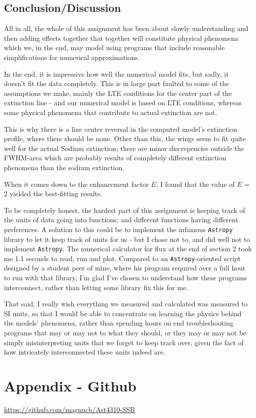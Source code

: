 \documentclass[11pt,a4paper,notitlepage]{article}
\begin{document}
\subsection{Conclusion/Discussion}
All in all, the whole of this assignment has been about slowly understanding and then adding effects together that together will constitute physical phenomena which we, in the end, may model using programs that include reasonable simplifications for numerical approximations.



In the end, it is impressive how well the numerical model fits, but sadly, it doesn't fit the data completely. This is in large part faulted to some of the assumptions we make, mainly the LTE conditions for the center part of the extinction line - and our numerical model is based on LTE conditions, whereas some physical phenomena that contribute to actual extinction are not.

This is why there is a line center reversal in the computed model's extinction profile, where there should be none. Other than this, the wings seem to fit quite well for the actual Sodium extinction; there are minor discrepencies outside the FWHM-area which are probably results of completely different extinction phenomena than the sodium extinction.

When it comes down to the enhancement factor $E$, I found that the value of $E$ = 2 yielded the best-fitting results.

To be completely honest, the hardest part of this assignment is keeping track of the units of data going into functions; and different functions having different preferences. A solution to this could be to implement the infamous \verb|Astropy| library to let it keep track of units for us - but I chose not to, and did well not to implement \verb|Astropy|. The numerical calculator for flux at the end of section 2 took me 1.1 seconds to read, run and plot. Compared to an \verb|Astropy|-oriented script designed by a student peer of mine, where his program required over a full hour to run with that library, I'm glad I've chosen to understand how these programs interconnect, rather than letting some library fix this for me.

That said, I really wish everything we measured and calculated was measured to SI units, so that I would be able to concentrate on learning the physics behind the models' phenomena, rather than spending hours on end troubleshooting programs that may or may not to what they should, or they may or may not be simply misinterpreting units that we forget to keep track over, given the fact of how intricately interconnected these units indeed are.

\section*{Appendix - Github} \label{section:github}
\url{https://github.com/magnucb/Ast4310-SSB}
\end{document}
